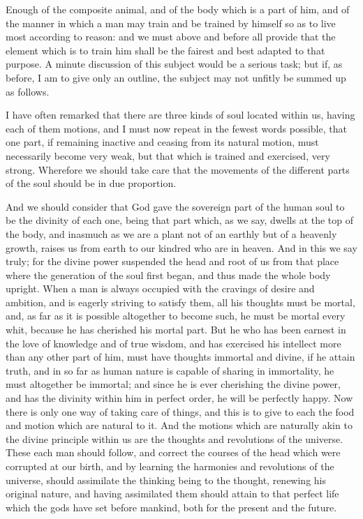 Enough of the composite animal, and of the body which is a part of him,
and of the manner in which a man may train and be trained by himself so as
to live most according to reason: and we must above and before all provide
that the element which is to train him shall be the fairest and best
adapted to that purpose. A minute discussion of this subject would be a
serious task; but if, as before, I am to give only an outline, the subject
may not unfitly be summed up as follows.

I have often remarked that there are three kinds of soul located within
us, having each of them motions, and I must now repeat in the fewest words
possible, that one part, if remaining inactive and ceasing from its
natural motion, must necessarily become very weak, but that which is
trained and exercised, very strong. Wherefore we should take care that the
movements of the different parts of the soul should be in due proportion.

And we should consider that God gave the sovereign part of the human soul
to be the divinity of each one, being that part which, as we say, dwells
at the top of the body, and inasmuch as we are a plant not of an earthly
but of a heavenly growth, raises us from earth to our kindred who are in
heaven. And in this we say truly; for the divine power suspended the head
and root of us from that place where the generation of the soul first
began, and thus made the whole body upright. When a man is always occupied
with the cravings of desire and ambition, and is eagerly striving to
satisfy them, all his thoughts must be mortal, and, as far as it is
possible altogether to become such, he must be mortal every whit, because
he has cherished his mortal part. But he who has been earnest in the love
of knowledge and of true wisdom, and has exercised his intellect more than
any other part of him, must have thoughts immortal and divine, if he
attain truth, and in so far as human nature is capable of sharing in
immortality, he must altogether be immortal; and since he is ever
cherishing the divine power, and has the divinity within him in perfect
order, he will be perfectly happy. Now there is only one way of taking
care of things, and this is to give to each the food and motion which are
natural to it. And the motions which are naturally akin to the divine
principle within us are the thoughts and revolutions of the universe.
These each man should follow, and correct the courses of the head which
were corrupted at our birth, and by learning the harmonies and revolutions
of the universe, should assimilate the thinking being to the thought,
renewing his original nature, and having assimilated them should attain to
that perfect life which the gods have set before mankind, both for the
present and the future.

